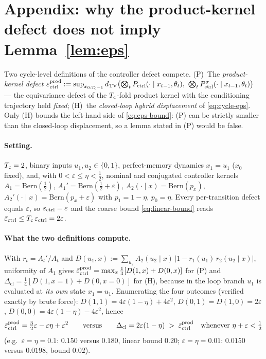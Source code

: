 \section{Appendix: why the product-kernel defect does not imply Lemma~\ref{lem:eps}}
\label{app:counterexample}

Two cycle-level definitions of the controller defect compete. (P)~The
\emph{product-kernel defect}
$\bar\varepsilon_{\mathrm{ctrl}}^{\mathrm{prod}} := \sup_{x_{0:T_{\mathrm{c}}-1}} d_{\mathrm{TV}}\bigl(\bigotimes_t
P_{\mathrm{ctrl}}(\cdot\mid x_{t-1},\theta_t),\ \bigotimes_t
P^{\sigma}_{\mathrm{ctrl}}(\cdot\mid x_{t-1},\theta_t)\bigr)$ --- the
equivariance defect of the $T_{\mathrm{c}}$-fold product kernel with the conditioning
trajectory held \emph{fixed}; (H)~the \emph{closed-loop hybrid displacement}
of \eqref{eq:cycle-eps}. Only (H) bounds the left-hand side of
\eqref{eq:eps-bound}: (P) can be strictly smaller than the closed-loop
displacement, so a lemma stated in (P) would be false.

\paragraph{Setting.}
$T_{\mathrm{c}}=2$, binary inputs $u_1,u_2\in\{0,1\}$, perfect-memory dynamics
$x_1=u_1$ ($x_0$ fixed), and, with $0<\varepsilon\le\eta<\tfrac12$, nominal
and conjugated controller kernels
$A_1=\mathrm{Bern}(\tfrac12)$, $A_1'=\mathrm{Bern}(\tfrac12+\varepsilon)$,
$A_2(\cdot\mid x)=\mathrm{Bern}(p_x)$, $A_2'(\cdot\mid x)=\mathrm{Bern}(p_x+\varepsilon)$
with $p_1=1-\eta$, $p_0=\eta$. Every per-transition defect equals
$\varepsilon$, so $\varepsilon_{\mathrm{ctrl}}=\varepsilon$ and the coarse bound
\eqref{eq:linear-bound} reads $\bar\varepsilon_{\mathrm{ctrl}}\le T_{\mathrm{c}}\,\varepsilon_{\mathrm{ctrl}}=2\varepsilon$.

\paragraph{What the two definitions compute.}
With $r_t=A_t'/A_t$ and
$D(u_1,x):=\sum_{u_2}A_2(u_2\mid x)\,\lvert 1-r_1(u_1)\,r_2(u_2\mid x)\rvert$,
uniformity of $A_1$ gives
$\bar\varepsilon_{\mathrm{ctrl}}^{\mathrm{prod}}=\max_{x}\tfrac14[D(1,x)+D(0,x)]$ for (P) and
$\Delta_{\mathrm{cl}}=\tfrac14[D(1,x{=}1)+D(0,x{=}0)]$ for (H), because in
the loop branch $u_1$ is evaluated at \emph{its own} state $x_1=u_1$.
Enumerating the four outcomes (verified exactly by brute force):
$D(1,1)=4\varepsilon(1-\eta)+4\varepsilon^2$, $D(0,1)=D(1,0)=2\varepsilon$,
$D(0,0)=4\varepsilon(1-\eta)-4\varepsilon^2$, hence
\[
  \bar\varepsilon_{\mathrm{ctrl}}^{\mathrm{prod}}=\tfrac32\varepsilon-\varepsilon\eta+\varepsilon^2
  \qquad\text{versus}\qquad
  \Delta_{\mathrm{cl}}=2\varepsilon(1-\eta)\;>\;\bar\varepsilon_{\mathrm{ctrl}}^{\mathrm{prod}}
  \quad\text{whenever }\eta+\varepsilon<\tfrac12
\]
(e.g.\ $\varepsilon=\eta=0.1$: $0.150$ versus $0.180$, linear bound $0.20$;
$\varepsilon=\eta=0.01$: $0.0150$ versus $0.0198$, bound $0.02$).

